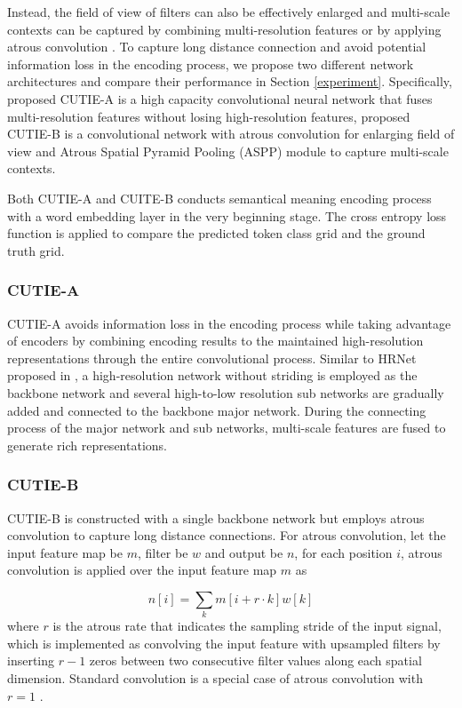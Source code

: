 \documentclass[10pt,twocolumn,letterpaper]{article}
\begin{document}
Instead, the field of view of filters can also be effectively enlarged and multi-scale contexts can be captured by combining multi-resolution features \cite{hrnet} or by applying atrous convolution \cite{deeplab, deeplabv1, deeplabv3, deeplabv3p}. To capture long distance connection and avoid potential information loss in the encoding process, we propose two different network architectures and compare their performance in Section \ref{experiment}. Specifically, proposed CUTIE-A is a high capacity convolutional neural network that fuses multi-resolution features without losing high-resolution features, proposed CUTIE-B is a convolutional network with atrous convolution for enlarging field of view and Atrous Spatial Pyramid Pooling (ASPP) module to capture multi-scale contexts. 

Both CUTIE-A and CUITE-B conducts semantical meaning encoding process with a word embedding layer in the very beginning stage. The cross entropy loss function is applied to compare the predicted token class grid and the ground truth grid.

\subsubsection{CUTIE-A}
CUTIE-A avoids information loss in the encoding process while taking advantage of encoders by combining encoding results to the maintained high-resolution representations through the entire convolutional process. Similar to HRNet proposed in \cite{hrnet}, a high-resolution network without striding is employed as the backbone network and several high-to-low resolution sub networks are gradually added and connected to the backbone major network. During the connecting process of the major network and sub networks, multi-scale features are fused to generate rich representations.

\subsubsection{CUTIE-B}
CUTIE-B is constructed with a single backbone network but employs atrous convolution to capture long distance connections. For atrous convolution, let the input feature map be $m$, filter be $w$ and output be $n$, for each position $i$, atrous convolution is applied over the input feature map $m$ as 

\begin{equation}
n[i] = \sum_k m[i+r\cdot k]w[k]
\end{equation}
where $r$ is the atrous rate that indicates the sampling stride of the input signal, which is implemented as convolving the input feature with upsampled filters by inserting $r-1$ zeros between two consecutive filter values along each spatial dimension. Standard convolution is a special case of atrous convolution with $r=1$ \cite{deeplabv1}.
\end{document}
